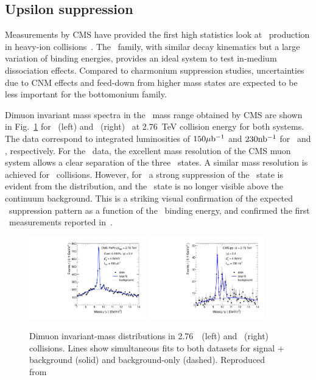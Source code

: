 \subsection{Upsilon suppression}

Measurements by CMS have provided the first high statistics look at \PgU\
production in heavy-ion collisions~\cite{CMS_Y_2010}.
The \PgU\ family, with similar decay kinematics but a large variation of binding energies,
provides an ideal system to test in-medium dissociation effects.
Compared to charmonium suppression studies, uncertainties due
to CNM effects and feed-down from higher mass states are expected to be
less important for the bottomonium family.

Dimuon invariant mass spectra in the \PgU\ mass range obtained by CMS are shown in 
Fig.~\ref{fig:GR:mass} for \PbPb\ (left) and \pp\ (right)~\cite{Chatrchyan:2012lxa}
at 2.76~TeV collision energy for both systems. 
The data correspond to integrated luminosities of $150\mathrm{\mu b^{-1}}$ and $230 \mathrm{nb^{-1}}$ for
\PbPb\ and \pp, respectively. For the \pp\ data, the excellent mass resolution of the CMS muon system
allows a clear separation of the three \PgUn\ states. A similar mass resolution is achieved 
for \PbPb\ collisions.
However, for \PbPb\ a strong suppression of the \PgUb\ state is evident from the 
distribution, and the \PgUc\ state is no longer visible above the continuum background. 
This is a striking visual confirmation of the expected
\PgU\ suppression pattern as a function of the \PgUn\ binding energy, and confirmed the 
first \PgU\ measurements reported in~\cite{CMS_Y_2010}.

\begin{figure}[t]
\begin{center}
    \includegraphics[width=0.45\textwidth]{qqbarfigures/hiFitPt4Erf}
    \includegraphics[width=0.45\textwidth]{qqbarfigures/ppFitPt4Erf}
    \caption{Dimuon invariant-mass distributions in 2.76\TeV\ \PbPb\ (left) and \pp\ (right)
collisions.  Lines show simultaneous fits to both
datasets for signal + background (solid) and background-only (dashed).
Reproduced from~\cite{Chatrchyan:2012lxa}}
\label{fig:GR:mass}
\end{center}
\end{figure}

